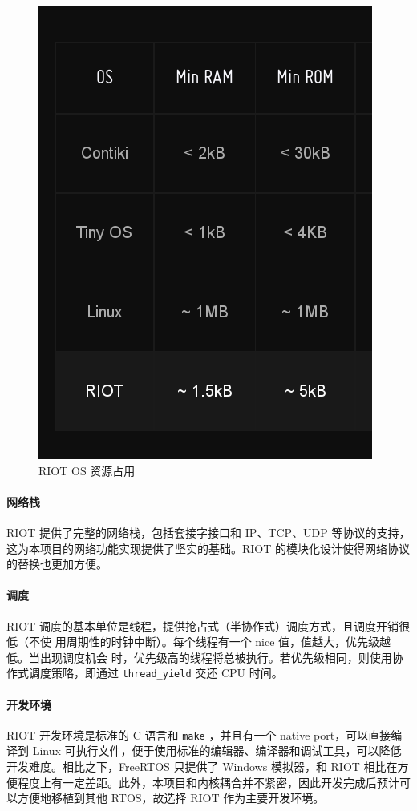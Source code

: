 \documentclass{ctexart}
\begin{document}
\begin{figure}
	\centering
	\includegraphics[scale=0.3]{RIOT-Resource.png}
	\caption{RIOT OS 资源占用}
	\label{RIOT-Resource}
\end{figure}


\paragraph{网络栈}
RIOT 提供了完整的网络栈，包括套接字接口和 IP、TCP、UDP 等协议的支持，这为本项目的网络功能实现提供了坚实的基础。RIOT 的模块化设计使得网络协议的替换也更加方便。

\paragraph{调度}
RIOT 调度的基本单位是线程，提供抢占式（半协作式）调度方式，且调度开销很低（不使
用周期性的时钟中断）。每个线程有一个 nice 值，值越大，优先级越低。当出现调度机会
时，优先级高的线程将总被执行。若优先级相同，则使用协作式调度策略，即通过
\verb|thread_yield| 交还 CPU 时间。

\paragraph{开发环境}
RIOT 开发环境是标准的 C 语言和 \verb|make| ，并且有一个 native port，可以直接编译到 Linux 可执行文件，便于使用标准的编辑器、编译器和调试工具，可以降低开发难度。相比之下，FreeRTOS 只提供了 Windows 模拟器，和 RIOT 相比在方便程度上有一定差距。此外，本项目和内核耦合并不紧密，因此开发完成后预计可以方便地移植到其他 RTOS，故选择 RIOT 作为主要开发环境。
\end{document}
